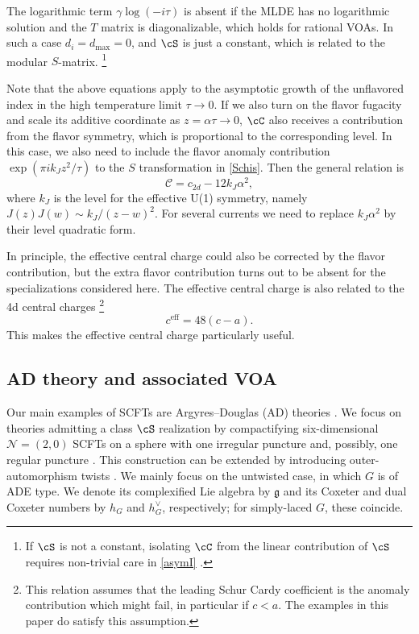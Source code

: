 \documentclass[a4paper,11pt]{article}
\theoremstyle{definition}
\theoremstyle{definition}
\theoremstyle{remark}
\newcommand{\ceff}{c^\text{eff}}
\newcommand{\be}{\begin{equation}}
\newcommand{\ee}{\end{equation}}
\begin{document}
 

 The logarithmic term $\gamma \log(-i \tau)$ is absent if the MLDE has no  logarithmic solution and the $T$ matrix is diagonalizable, which holds for    rational VOAs. In such a case  $d_i=d_{\text{max}}=0$, and $\cS$ is just a constant, which is related to the modular $S$-matrix.  
 \footnote{If $\cS$ is not a constant, isolating $\cC$ from the linear contribution  of $\cS$ requires  non-trivial care in \eqref{asymI} .}

 Note that the above equations apply to the asymptotic growth  of the unflavored index in the high temperature limit $\tau \to 0$.   If we also turn on the flavor fugacity and scale its additive   coordinate as $z=\alpha\tau\to0$,   $\cC$ also receives a contribution from the  flavor symmetry, which is proportional to the corresponding  level. In this case, we also need to include the flavor anomaly contribution $\exp( \pi i k_J z^2/\tau )$ to the $S$ transformation in \eqref{Schis}. Then the general relation is
 \be\label{cCsJ}
  \mathcal C=c_{2d}-12k_J\alpha^2,
 \ee 
  where $k_J$ is the   level for  the effective U(1) symmetry, namely  $J(z)J(w)\sim k_J/(z-w)^2$.  For several currents we need to replace $k_J\alpha^2$ by their level quadratic form.  
  
  In principle, the effective central charge could also be corrected by the flavor contribution, but the extra flavor contribution  turns out to be absent for the specializations considered here.    The effective central charge is also related to the 4d   central charges   \cite{Beem:2017ooy}
  \footnote{This relation assumes that the leading Schur Cardy coefficient is the anomaly contribution which might fail, in particular if $c<a$. The examples in this paper do  satisfy this assumption.} 
\be\label{ceffac}
\ceff=48(c - a).
\ee
 This makes the effective central charge particularly useful. 
  
  
  
  \subsection{AD theory and associated VOA }
  
  Our main examples of SCFTs are Argyres--Douglas (AD) theories  \cite{Argyres:1995jj}. We focus on theories admitting a class $\cS$ realization by compactifying six-dimensional $\mathcal N=(2,0)$ SCFTs on a sphere with one irregular puncture and, possibly, one regular puncture \cite{Xie:2012hs}. This construction can be extended by introducing outer-automorphism twists \cite{Wang:2018gvb}. We mainly focus on the untwisted case, in which $G$ is of ADE type. We denote its complexified Lie algebra by $\mathfrak g$ and its Coxeter and dual Coxeter numbers by $h_G$ and $h_G^\vee$, respectively; for simply-laced $G$, these coincide.
\end{document}
